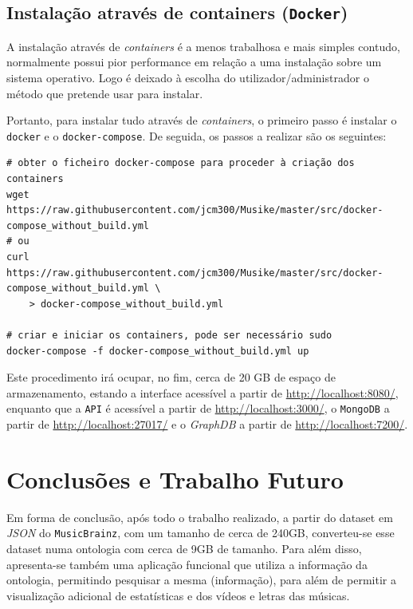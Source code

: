 \documentclass{article}
\begin{document}
\subsection{Instalação através de containers (\texttt{Docker})}

A instalação através de \textit{containers} é a menos trabalhosa e mais simples contudo, normalmente possui pior performance em relação a uma instalação sobre um sistema operativo. Logo é deixado à escolha do utilizador/administrador o método que pretende usar para instalar.

Portanto, para instalar tudo através de \textit{containers}, o primeiro passo é instalar o \texttt{docker} e o \texttt{docker-compose}. De seguida, os passos a realizar são os seguintes:

\small
\begin{framed}
\begin{verbatim}
# obter o ficheiro docker-compose para proceder à criação dos containers
wget https://raw.githubusercontent.com/jcm300/Musike/master/src/docker-compose_without_build.yml
# ou
curl https://raw.githubusercontent.com/jcm300/Musike/master/src/docker-compose_without_build.yml \ 
    > docker-compose_without_build.yml

# criar e iniciar os containers, pode ser necessário sudo
docker-compose -f docker-compose_without_build.yml up
\end{verbatim}
\end{framed}
\normalsize

Este procedimento irá ocupar, no fim, cerca de 20 GB de espaço de armazenamento, estando a interface acessível a partir de \url{http://localhost:8080/}, enquanto que a \texttt{API} é acessível a partir de \url{http://localhost:3000/}, o \texttt{MongoDB} a partir de \url{http://localhost:27017/} e o \textit{GraphDB} a partir de \url{http://localhost:7200/}.

\section{Conclusões e Trabalho Futuro} \label{future}

Em forma de conclusão, após todo o trabalho realizado, a partir do dataset em \textit{JSON} do \texttt{MusicBrainz}, com um tamanho de cerca de 240GB, converteu-se esse dataset numa ontologia com cerca de 9GB de tamanho. Para além disso, apresenta-se também uma aplicação funcional que utiliza a informação da ontologia, permitindo pesquisar a mesma (informação), para além de permitir a visualização adicional de estatísticas e dos vídeos e letras das músicas.
\end{document}
